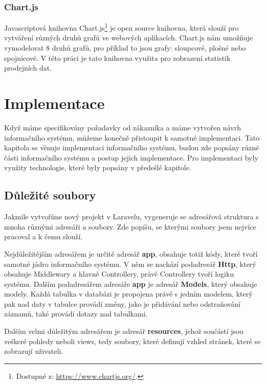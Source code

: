 \subsection{Chart.js} 

Javascriptová knihovna Chart.js\footnote[3]{Dostupné z: \url{https://www.chartjs.org/}.} je open source knihovna, která slouží pro vytváření různých druhů grafů ve webových aplikacích. Chart.js nám umožňuje vymodelovat 8 druhů grafů, pro příklad to jsou grafy: sloupcové, plošné nebo spojnicové. V této práci je tato knihovna využita pro zobrazení statistik prodejních dat. \cite{chart}




\chapter{Implementace}
\label{implementation}

Když máme specifikovány požadavky od zákazníka a máme vytvořen návrh informačního systému, můžeme konečně přistoupit k samotné implementaci. Tato kapitola se věnuje implementaci informačního systému, budou zde popsány různé části informačního systému a postup jejich implementace. Pro implementaci byly využity technologie, které byly popsány v předešlé kapitole.


\section{Důležité soubory}

Jakmile vytvoříme nový projekt v Laravelu, vygeneruje se adresářová struktura s mnoha různými adresáři a soubory. Zde popíšu, se kterými soubory jsem nejvíce pracoval a k čemu slouží.

Nejdůležitějším adresářem je určitě adresář \textbf{app}, obsahuje totiž kódy, které tvoří samotné jádro informačního systému. V něm se nachází podadresář \textbf{Http}, který obsahuje Middlewary a hlavně Controllery, právě Controllery tvoří logiku systému. Dalším podadresářem adresáře \textbf{app} je adresář \textbf{Models}, který obsahuje modely. Každá tabulka v databázi je propojena právě s jedním modelem, který pak nad daty v tabulce provádí změny, jako je přidávání nebo odstraňování záznamů, také provádí dotazy nad tabulkami.

Dalším velmi důležitým adresářem je adresář \textbf{resources}, jehož součástí jsou veškeré pohledy neboli views, tedy soubory, které definují vzhled stránek, které se zobrazují uživateli.

